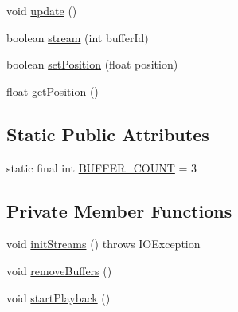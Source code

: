 \begin{DoxyCompactItemize}
\item 
void \mbox{\hyperlink{classorg_1_1newdawn_1_1slick_1_1openal_1_1_open_a_l_stream_player_af92a75dd6caa02680b7520511137ae8d}{update}} ()
\item 
boolean \mbox{\hyperlink{classorg_1_1newdawn_1_1slick_1_1openal_1_1_open_a_l_stream_player_a2facc6d1dcd937dbdc5dadcbb81929ed}{stream}} (int buffer\+Id)
\item 
boolean \mbox{\hyperlink{classorg_1_1newdawn_1_1slick_1_1openal_1_1_open_a_l_stream_player_ae35c80f50f55bb5efc88aebf809f7d5b}{set\+Position}} (float position)
\item 
float \mbox{\hyperlink{classorg_1_1newdawn_1_1slick_1_1openal_1_1_open_a_l_stream_player_a9abaf98266809fa03b92f42744a3d332}{get\+Position}} ()
\end{DoxyCompactItemize}
\subsection*{Static Public Attributes}
\begin{DoxyCompactItemize}
\item 
static final int \mbox{\hyperlink{classorg_1_1newdawn_1_1slick_1_1openal_1_1_open_a_l_stream_player_a6fabd8395e8301d9b2ea613f8b7d739c}{B\+U\+F\+F\+E\+R\+\_\+\+C\+O\+U\+NT}} = 3
\end{DoxyCompactItemize}
\subsection*{Private Member Functions}
\begin{DoxyCompactItemize}
\item 
void \mbox{\hyperlink{classorg_1_1newdawn_1_1slick_1_1openal_1_1_open_a_l_stream_player_a765f3c95de540350a0ed4902a6d9792a}{init\+Streams}} ()  throws I\+O\+Exception 
\item 
void \mbox{\hyperlink{classorg_1_1newdawn_1_1slick_1_1openal_1_1_open_a_l_stream_player_a6819d005f935905cb6c8419154ed05a5}{remove\+Buffers}} ()
\item 
void \mbox{\hyperlink{classorg_1_1newdawn_1_1slick_1_1openal_1_1_open_a_l_stream_player_a42538934813aebc2b0b210953afc74d6}{start\+Playback}} ()
\end{DoxyCompactItemize}
